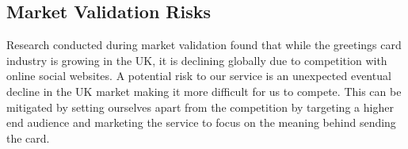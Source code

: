 \documentclass[10pt,a4paper]{article}
\begin{document}
\subsection*{Market Validation Risks}
Research conducted during market validation found that while the greetings card industry is growing in the UK, it is declining globally due to competition with online social websites. A potential risk to our service is an unexpected eventual decline in the UK market making it more difficult for us to compete. This can be mitigated by setting ourselves apart from the competition by targeting a higher end audience and marketing the service to focus on the meaning behind sending the card.










\clearpage
\end{document}

